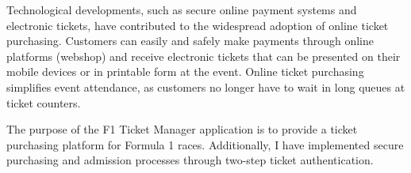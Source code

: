 Technological developments, such as secure online payment systems and electronic tickets, have contributed to the widespread adoption of online ticket purchasing. Customers can easily and safely make payments through online platforms (webshop) and receive electronic tickets that can be presented on their mobile devices or in printable form at the event. Online ticket purchasing simplifies event attendance, as customers no longer have to wait in long queues at ticket counters.

The purpose of the F1 Ticket Manager application is to provide a ticket purchasing platform for Formula 1 races. Additionally, I have implemented secure purchasing and admission processes through two-step ticket authentication.

\vfill
\dolgozatnyelve
{}